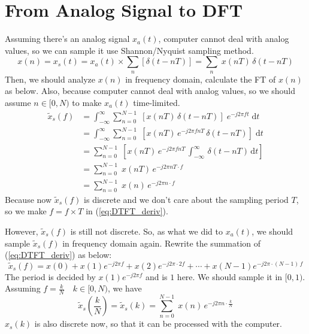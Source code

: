 \documentclass{article}
\begin{document}
\section{From Analog Signal to DFT}
Assuming there's an analog signal $x_a(t)$, computer cannot deal with analog values, so we can sample it use Shannon/Nyquist sampling method. 
\begin{equation}
x(n) = x_s(t) =  x_a(t) \times \sum_{n} \left[ \delta(t- nT) \right] = \sum_{n} \; x(nT) \, \delta(t - nT)
\label{eq:Sampling_Mod}
\end{equation}
Then, we should analyze $x(n)$ in frequency domain, calculate the FT of $x(n)$ as below. Also, because computer cannot deal with analog values, so we should assume $n \in [0, N)$ to make $x_a(t)$ time-limited.
\begin{equation}
\begin{aligned}
	\widetilde{x}_s(f) &= \int_{- \infty}^{\infty} \sum_{n = 0}^{N - 1} \; \left[  x(nT) \, \delta(t - nT) \right] \; e^{-j 2\pi ft}\; \mathrm{d} t \\
	&= \int_{- \infty}^{\infty} \sum_{n = 0}^{N - 1} \; \left[  x(nT)  \, e^{-j 2\pi f nT} \, \delta(t - nT) \right] \; \mathrm{d} t \\
	&= \sum_{n = 0}^{N - 1} \; \left[  x(nT)  \, e^{-j 2\pi f nT} \, \int_{- \infty}^{\infty} \, \delta(t - nT) \, \mathrm{d} t  \right]\\
	&= \sum_{n = 0}^{N - 1} \; x(nT)  \, e^{-j 2\pi nT \cdot f} \\ 
	&= \sum_{n = 0}^{N - 1} \; x(n)  \, e^{-j 2\pi n \cdot f}
\end{aligned}
\label{eq:DTFT_deriv}
\end{equation}
Because now $\widetilde{x}_s(f)$ is discrete and we don't care about the sampling period $T$, so we make $f = f \times T$ in (\ref{eq:DTFT_deriv}).

However, $\widetilde{x}_s(f)$ is still not discrete. So, as what we did to $x_a(t)$, we should sample $\widetilde{x}_s(f)$ in frequency domain again. Rewrite the summation of (\ref{eq:DTFT_deriv}) as below:
$$
\widetilde{x}_s(f) = x(0) + x(1)e^{-j 2\pi f} + x(2)e^{-j 2\pi \cdot 2f} + \cdots + x(N - 1) e^{-j 2\pi \cdot (N - 1)\,f}
$$
The period is decided by $x(1)e^{-j 2\pi f}$ and is $1$ here. We should sample it in $[0, 1)$. Assuming $f = \frac{k}{N} \quad k \in [0, N)$, we have
\begin{equation*}
\widetilde{x}_s(\frac{k}{N}) = \widetilde{x}_s(k) = \sum_{n = 0}^{N - 1} \; x(n)  \, e^{-j 2\pi n \cdot \frac{k}{N}}
\label{eq:DFT}
\end{equation*}
$x_s(k)$ is also discrete now, so that it can be processed with the computer.
\end{document}
